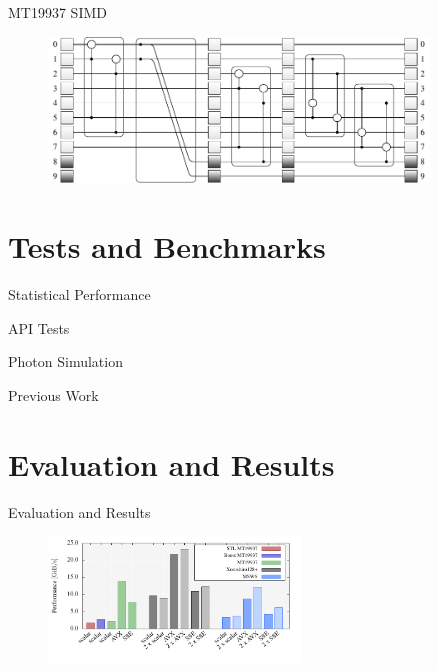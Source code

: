 \documentclass[aspectratio=169]{beamer}
\begin{document}
    \begin{frame}{MT19937 SIMD}
      \begin{figure}
        \includegraphics[width=0.9\textwidth]{figures/mt19937_vector_loop_scheme.pdf}
      \end{figure}
    \end{frame}

  \section{Tests and Benchmarks} %
  \label{sec:tests_and_benchmarks}
    \begin{frame}{Statistical Performance}

    \end{frame}

    \begin{frame}{API Tests}

    \end{frame}

    \begin{frame}{Photon Simulation}

    \end{frame}

    \begin{frame}{Previous Work}

    \end{frame}

  \section{Evaluation and Results} %
  \label{sec:evaluation_and_results}
    \begin{frame}{Evaluation and Results}
      \begin{figure}
        \includegraphics[width=0.6\textwidth]{figures/generation_desktop.pdf}
      \end{figure}
    \end{frame}
\end{document}
